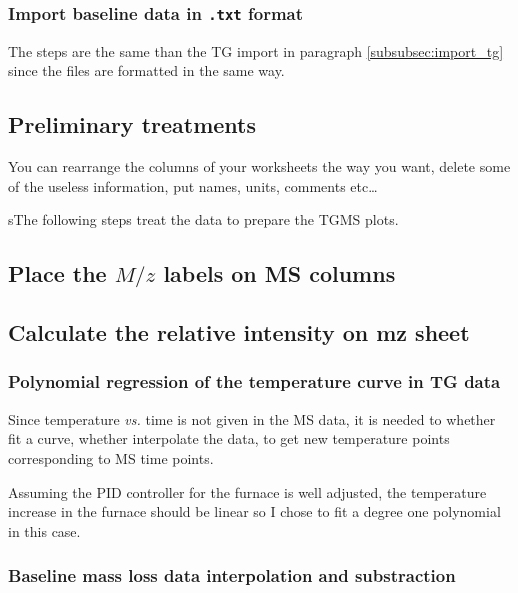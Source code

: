 \documentclass[a4paper, 11pt, raggedright, parskip]{tufte-style-article}
\begin{document}
\subsubsection{Import baseline data in \texttt{.txt} format}

The steps are the same than the TG import in paragraph \ref{subsubsec:import_tg} since the files are formatted in the same way.


\subsection{Preliminary treatments}

You can rearrange the columns of your worksheets the way you want, delete some of the useless information, put names, units, comments etc\dots{}

sThe following steps treat the data to prepare the TGMS plots.


\subsection{Place the $M/z$ labels on MS columns}


\subsection{Calculate the relative intensity on mz sheet}


\subsubsection{Polynomial regression of the temperature curve in TG data}

Since temperature \textit{vs.} time is not given in the MS data, it is needed to whether fit a curve, whether interpolate the data, to get new temperature points corresponding to MS time points.
 
Assuming the {\lsstyle PID} controller for the furnace is well adjusted, the temperature increase in the furnace should be linear so I chose to fit a degree one polynomial in this case.




\subsubsection[Baseline mass loss data interpolation and substraction]{Baseline mass loss data interpolation and substraction}
\end{document}
